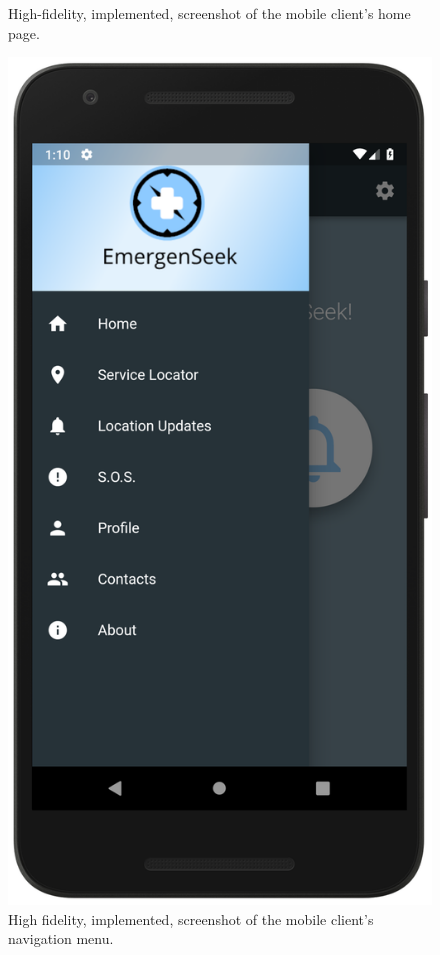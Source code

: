 \documentclass[10pt, a4paper]{article}
\begin{document}
\begin{figure}[H]
  \caption{High-fidelity, implemented, screenshot of the mobile client's home page.}\label{fig:mobile1}
\endminipage\hfill
{}
  \includegraphics[width=\linewidth]{demo_navmenu.png}
  \caption{High fidelity, implemented, screenshot of the mobile client's navigation menu.}\label{fig:mobile2}

\end{figure}
\end{document}
